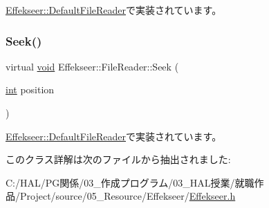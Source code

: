 \mbox{\hyperlink{class_effekseer_1_1_default_file_reader_ae00fd8b1031e13bd5a43d74f03d7ed79}{Effekseer\+::\+Default\+File\+Reader}}で実装されています。

\mbox{\label{class_effekseer_1_1_file_reader_a5daeb98049f994bccf874b2374e36a25}} 
\subsubsection{\texorpdfstring{Seek()}{Seek()}}
{\footnotesize\ttfamily virtual \mbox{\hyperlink{namespace_effekseer_ab34c4088e512200cf4c2716f168deb56}{void}} Effekseer\+::\+File\+Reader\+::\+Seek (\begin{DoxyParamCaption}\item[{\mbox{\hyperlink{namespace_effekseer_ace0abf7c2e6947e519ebe8b54cbcc30a}{int}}}]{position }\end{DoxyParamCaption})\hspace{0.3cm}{\ttfamily [pure virtual]}}



\mbox{\hyperlink{class_effekseer_1_1_default_file_reader_a9c9e821e4508708a2c91a9ab486b2709}{Effekseer\+::\+Default\+File\+Reader}}で実装されています。



このクラス詳解は次のファイルから抽出されました\+:\begin{DoxyCompactItemize}
\item 
C\+:/\+H\+A\+L/\+P\+G関係/03\+\_\+作成プログラム/03\+\_\+\+H\+A\+L授業/就職作品/\+Project/source/05\+\_\+\+Resource/\+Effekseer/\mbox{\hyperlink{_effekseer_8h}{Effekseer.\+h}}\end{DoxyCompactItemize}
